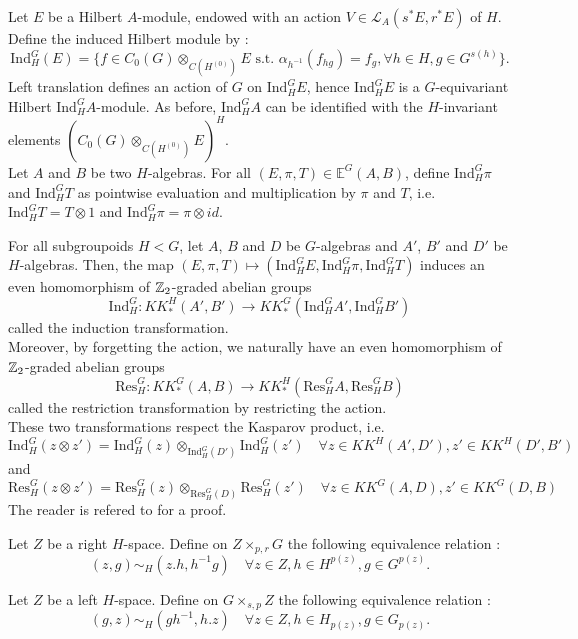Let $E$ be a Hilbert $A$-module, endowed with an action $V\in\mathcal L_A(s^*E,r^*E)$ of $H$. Define the induced Hilbert module by :
\[\text{Ind}_H^G (E) = \{f \in C_0(G)\otimes_{C(H^{(0)})} E \text{ s.t. } \alpha_{h^{-1}}(f_{hg}) = f_g,\forall h\in H,g\in G^{s(h)}\}. \]
Left translation defines an action of $G$ on $\text{Ind}_H^G E$, hence $\text{Ind}_H^G E$ is a $G$-equivariant Hilbert $\text{Ind}_H^G A$-module. As before, $\text{Ind}_H^G A$ can be identified with the $H$-invariant elements $(C_0(G)\otimes_{C(H^{(0)})} E)^H$.\\

Let $A$ and $B$ be two $H$-algebras. For all $(E,\pi,T)\in \mathbb E^G(A,B)$, define $\text{Ind}_H^G \pi$ and $\text{Ind}_H^G T$ as pointwise evaluation and multiplication by $\pi$ and $T$, i.e. $\text{Ind}_H^G T = T\otimes 1$ and $\text{Ind}_H^G \pi  = \pi\otimes id$.

\begin{definition}
For all subgroupoids $H<G$, let $A$, $B$ and $D$ be $G$-algebras and $A'$, $B'$ and $D'$ be $H$-algebras. Then, the map $(E,\pi,T)\mapsto ( \text{Ind}_H^G E, \text{Ind}_H^G\pi ,\text{Ind}_H^G T )$ induces an even homomorphism of $\mathbb Z_2$-graded abelian groups
\[\text{Ind}_H^G : KK_*^H(A',B')\rightarrow KK_*^G( \text{Ind}_H^G A', \text{Ind}_H^G B') \] 
called the induction transformation.\\
Moreover, by forgetting the action, we naturally have an even homomorphism of $\mathbb Z_2$-graded abelian groups 
\[\text{Res}_H^G : KK_*^G(A,B)\rightarrow KK_*^H( \text{Res}_H^G A, \text{Res}_H^G B) \] 
called the restriction transformation by restricting the action.\\
These two transformations respect the Kasparov product, i.e. 
\[ \text{Ind}_H^G(z\otimes z') = \text{Ind}_H^G(z)\otimes_{\text{Ind}_H^G(D')}\text{Ind}_H^G(z')\quad \forall z\in KK^H(A',D'),z'\in KK^H(D',B') \]
and 
\[ \text{Res}_H^G(z\otimes z') = \text{Res}_H^G(z)\otimes_{\text{Res}_H^G(D)}\text{Res}_H^G(z')\quad \forall z\in KK^G(A,D),z'\in KK^G(D,B) \]
The reader is refered to \cite{LeGall} for a proof.
\end{definition}   

Let $Z$ be a right $H$-space. Define on $Z\times_{p,r} G$ the following equivalence relation :
\[(z,g)\sim_H (z.h, h^{-1}g)\quad \forall z\in Z, h\in H^{p(z)},g\in G^{p(z)}.\]

Let $Z$ be a left $H$-space. Define on $G \times_{s,p} Z $ the following equivalence relation :
\[(g,z)\sim_H (gh^{-1}, h.z)\quad \forall z\in Z, h\in H_{p(z)},g\in G_{p(z)}.\]

